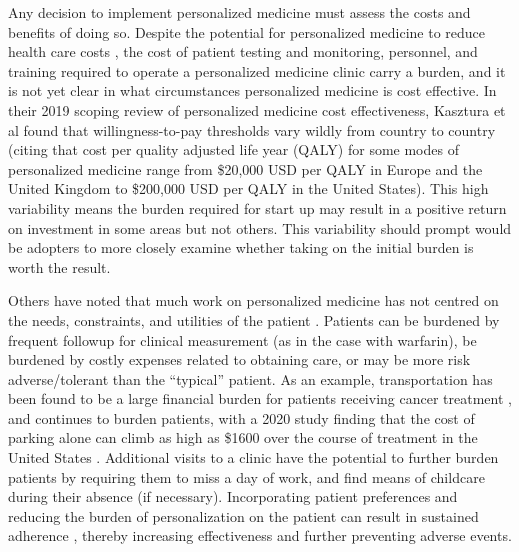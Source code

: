 Any decision to implement personalized medicine must assess the costs and benefits of doing so. Despite the potential for personalized medicine to reduce health care costs \cite{looff2016economic,shabaruddin2015economic}, the cost of patient testing and monitoring, personnel, and training required to operate a personalized medicine clinic carry a burden, and it is not yet clear in what circumstances personalized medicine is cost effective.  In their 2019 scoping review of personalized medicine cost effectiveness, Kasztura et al \cite{kasztura2019cost} found that willingness-to-pay thresholds vary wildly from country to country (citing that cost per quality adjusted life year (QALY) for some modes of personalized medicine range from \$20,000 USD per QALY in Europe and the United Kingdom to \$200,000 USD per QALY in the United States).  This high variability means the burden required for start up may result in a positive return on investment in some areas but not others. This variability should prompt would be adopters to more closely examine whether taking on the initial burden is worth the result.

Others have noted that  much work on personalized medicine has not centred on the needs, constraints, and utilities of the patient \cite{rogowski2015concepts, di2017personalized}. Patients can be burdened by frequent followup for clinical measurement (as in the case with warfarin), be burdened by costly expenses related to obtaining care, or may be more risk adverse/tolerant than the ``typical'' patient. As an example, transportation has been found to be a large financial burden for patients receiving cancer treatment \cite{houts1984nonmedical}, and continues to burden patients, with a 2020 study finding that the cost of parking alone can climb as high as \$1600 over the course of treatment in the United States \cite{lee2020assessment}.  Additional visits to a clinic have the potential to further burden patients by requiring them to miss a day of work, and find means of childcare during their absence (if necessary). Incorporating patient preferences and reducing the burden of personalization on the patient can result in sustained adherence \cite{elliott2008understanding}, thereby increasing effectiveness and further preventing adverse events.

